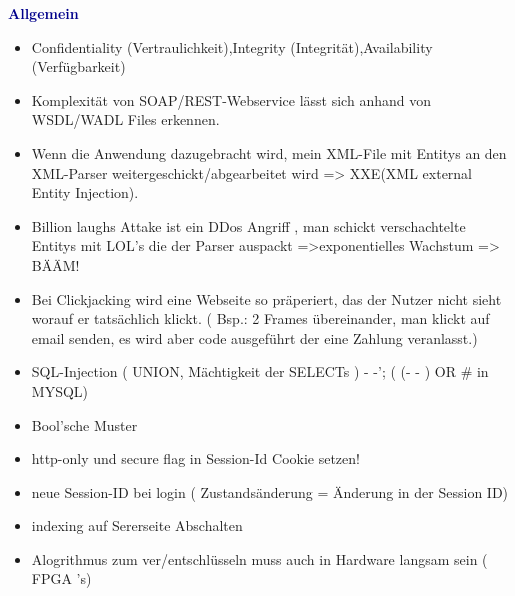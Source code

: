 \textbf{\textcolor{darkblue}{ Allgemein}}~
	\begin{itemize}
		
	\item Confidentiality (Vertraulichkeit),Integrity (Integrität),Availability (Verfügbarkeit)
	\item Komplexität von SOAP/REST-Webservice lässt sich anhand von WSDL/WADL Files erkennen.
	\item Wenn die Anwendung dazugebracht wird, mein XML-File mit Entitys an den XML-Parser weitergeschickt/abgearbeitet wird => XXE(XML external Entity Injection).
	\item Billion laughs Attake ist ein DDos Angriff , man schickt verschachtelte Entitys mit LOL's die der Parser auspackt  =>exponentielles Wachstum => BÄÄM!
	\item Bei Clickjacking wird eine Webseite so präperiert, das der Nutzer nicht sieht worauf er tatsächlich klickt. ( Bsp.: 2 Frames übereinander, man klickt auf email senden, es wird aber code ausgeführt der eine Zahlung veranlasst.)
	\item SQL-Injection ( UNION, Mächtigkeit der SELECTs ) - -'; ( (- - ) OR \# in MYSQL)
	\item Bool'sche Muster
	\item http-only und secure flag in Session-Id Cookie setzen!
	\item  neue Session-ID bei login ( Zustandsänderung = Änderung in der Session ID)
	\item  indexing auf Sererseite Abschalten
	\item Alogrithmus zum ver/entschlüsseln muss auch in Hardware langsam sein ( FPGA\'{ '}s)
	
	\end{itemize}














